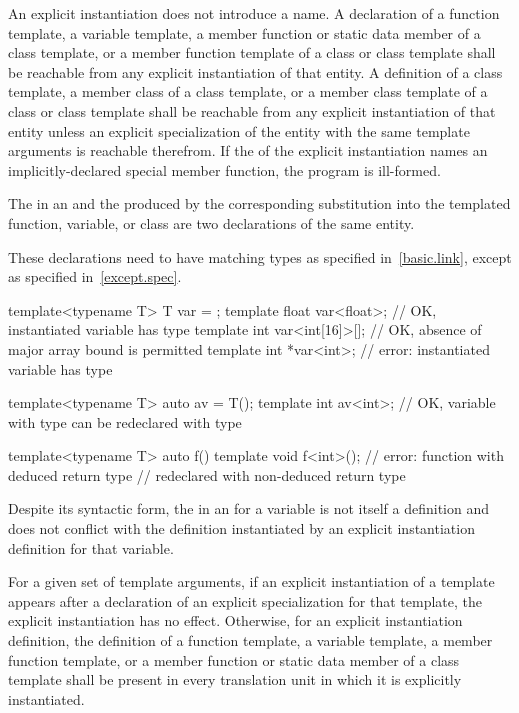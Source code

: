 \pnum
An explicit instantiation does not introduce a name.
A declaration of a function template, a variable template, a member function
or static data member
of a class template, or a member function template of a class or class
template shall be reachable from any explicit instantiation of that entity.
A definition
of a class template, a member class of a class template, or a member class
template of a class or class template shall be reachable from any explicit instantiation
of that entity unless an explicit
specialization of the entity with the same template arguments
is reachable therefrom.
If the 
of the explicit instantiation names an implicitly-declared special member
function, the program is ill-formed.

\pnum
The  in an  and
the  produced by the corresponding substitution
into the templated function, variable, or class
are two declarations of the same entity.
\begin{note}
These declarations need to have matching types as specified in~\ref{basic.link}, except as specified in~\ref{except.spec}.
\begin{example}
\begin{codeblock}
template<typename T> T var = {};
template float var<float>;      // OK, instantiated variable has type 
template int var<int[16]>[];    // OK, absence of major array bound is permitted
template int *var<int>;         // error: instantiated variable has type 

template<typename T> auto av = T();
template int av<int>;           // OK, variable with type  can be redeclared with type 

template<typename T> auto f() {}
template void f<int>();         // error: function with deduced return type
                                // redeclared with non-deduced return type
\end{codeblock}
\end{example}
\end{note}
Despite its syntactic form, the  in an  for a variable is not itself a definition and does not conflict with the definition instantiated by an explicit instantiation definition for that variable.

\pnum
For a given set of template arguments, if an explicit
instantiation of a template appears after a declaration of
an explicit specialization for that template, the explicit
instantiation has no effect. Otherwise, for an explicit instantiation
definition, the definition of a
function template, a variable template, a member
function template, or a member function or static
data member of a class template shall be present in every
translation unit in which it is explicitly instantiated.

